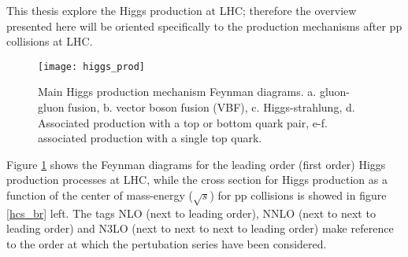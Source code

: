 \noindent This thesis explore the Higgs production at LHC; therefore the overview presented here will be oriented specifically to the production mechanisms after pp collisions at LHC.

\begin{figure}[!h]
\centering
\texttt{[image: higgs\_prod]}
\caption[Higgs production mechanism Feynman diagrams]{Main Higgs production mechanism Feynman diagrams. a. gluon-gluon fusion, b. vector boson fusion (VBF), c. Higgs-strahlung, d. Associated production with a top or bottom quark pair, e-f. associated production with a single top quark.}
\label{higgs_prod}
\end{figure}

\noindent Figure \ref{higgs_prod} shows the Feynman diagrams for the leading order (first order) Higgs production processes at LHC, while the cross section for Higgs production as a function of the center of mass-energy ($\sqrt{s}$) for pp collisions is showed in figure \ref{hcs_br} left. The tags NLO (next to leading order), NNLO (next to next to leading order) and N3LO (next to next to next to leading order) make reference to the order at which the pertubation series have been considered.

